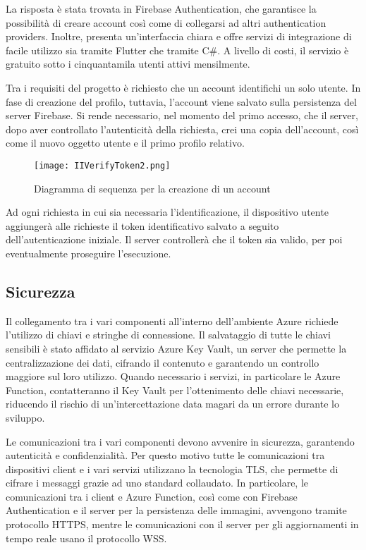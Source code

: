 La risposta è stata trovata in Firebase Authentication, che garantisce la possibilità di creare account così come di collegarsi ad altri authentication providers. Inoltre, presenta un’interfaccia chiara e offre servizi di integrazione di facile utilizzo sia tramite Flutter che tramite C\#. A livello di costi, il servizio è gratuito sotto i cinquantamila utenti attivi mensilmente.

Tra i requisiti del progetto è richiesto che un account identifichi un solo utente. In fase di creazione del profilo, tuttavia, l’account viene salvato sulla persistenza del server Firebase. 
Si rende necessario, nel momento del primo accesso, che il server, dopo aver controllato l’autenticità della richiesta, crei una copia dell’account, così come il nuovo oggetto utente e il primo profilo relativo.
\begin{figure}[h!]
    \centering
    \texttt{[image: IIVerifyToken2.png]}
    \caption{Diagramma di sequenza per la creazione di un account}
\end{figure}
Ad ogni richiesta in cui sia necessaria l’identificazione, il dispositivo utente aggiungerà alle richieste il token identificativo salvato a seguito dell’autenticazione iniziale. Il server controllerà che il token sia valido, per poi eventualmente proseguire l’esecuzione.


\clearpage
\subsection{Sicurezza}

Il collegamento tra i vari componenti all’interno dell’ambiente Azure richiede l’utilizzo di chiavi e stringhe di connessione. Il salvataggio di tutte le chiavi sensibili è stato affidato al servizio Azure Key Vault, un server che permette la centralizzazione dei dati, cifrando il contenuto e garantendo un controllo maggiore sul loro utilizzo. Quando necessario i servizi, in particolare le Azure Function, contatteranno il Key Vault per l’ottenimento delle chiavi necessarie, riducendo il rischio di un’intercettazione data magari da un errore durante lo sviluppo.

Le comunicazioni tra i vari componenti devono avvenire in sicurezza, garantendo autenticità e confidenzialità. Per questo motivo tutte le comunicazioni tra dispositivi client e i vari servizi utilizzano la tecnologia TLS, che permette di cifrare i messaggi grazie ad uno standard collaudato. In particolare, le comunicazioni tra i client e Azure Function, così come con Firebase Authentication e il server per la persistenza delle immagini, avvengono tramite protocollo HTTPS, mentre le comunicazioni con il server per gli aggiornamenti in tempo reale usano il protocollo WSS.

